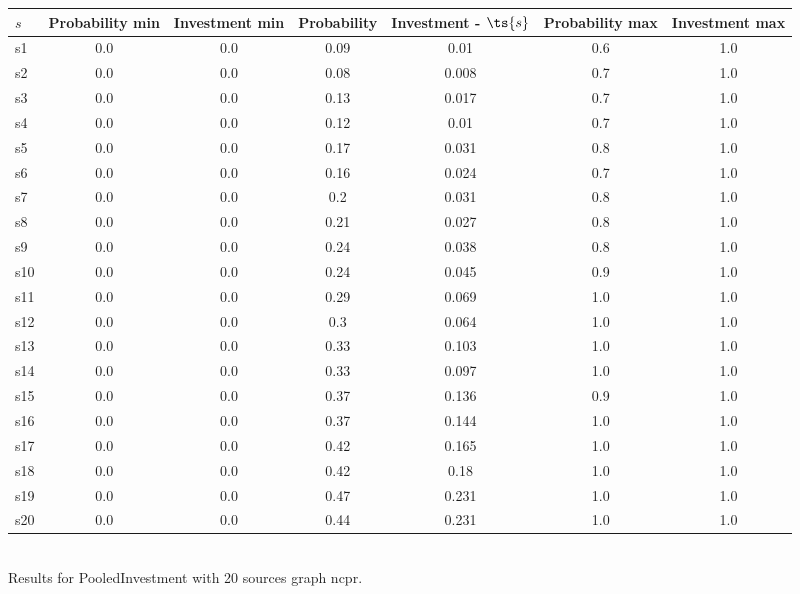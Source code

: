 \documentclass{article}
\begin{document}
\noindent\begin{tabular}{|l|c|c|c|c|c|c|}
\hline
$s$& Probability min & Investment min & Probability & Investment - $\ts{s}$ & Probability max & Investment max\\
\hline
s1 &0.0 & 0.0 & 0.09 & 0.01 & 0.6 & 1.0\\
\hline
s2 &0.0 & 0.0 & 0.08 & 0.008 & 0.7 & 1.0\\
\hline
s3 &0.0 & 0.0 & 0.13 & 0.017 & 0.7 & 1.0\\
\hline
s4 &0.0 & 0.0 & 0.12 & 0.01 & 0.7 & 1.0\\
\hline
s5 &0.0 & 0.0 & 0.17 & 0.031 & 0.8 & 1.0\\
\hline
s6 &0.0 & 0.0 & 0.16 & 0.024 & 0.7 & 1.0\\
\hline
s7 &0.0 & 0.0 & 0.2 & 0.031 & 0.8 & 1.0\\
\hline
s8 &0.0 & 0.0 & 0.21 & 0.027 & 0.8 & 1.0\\
\hline
s9 &0.0 & 0.0 & 0.24 & 0.038 & 0.8 & 1.0\\
\hline
s10 &0.0 & 0.0 & 0.24 & 0.045 & 0.9 & 1.0\\
\hline
s11 &0.0 & 0.0 & 0.29 & 0.069 & 1.0 & 1.0\\
\hline
s12 &0.0 & 0.0 & 0.3 & 0.064 & 1.0 & 1.0\\
\hline
s13 &0.0 & 0.0 & 0.33 & 0.103 & 1.0 & 1.0\\
\hline
s14 &0.0 & 0.0 & 0.33 & 0.097 & 1.0 & 1.0\\
\hline
s15 &0.0 & 0.0 & 0.37 & 0.136 & 0.9 & 1.0\\
\hline
s16 &0.0 & 0.0 & 0.37 & 0.144 & 1.0 & 1.0\\
\hline
s17 &0.0 & 0.0 & 0.42 & 0.165 & 1.0 & 1.0\\
\hline
s18 &0.0 & 0.0 & 0.42 & 0.18 & 1.0 & 1.0\\
\hline
s19 &0.0 & 0.0 & 0.47 & 0.231 & 1.0 & 1.0\\
\hline
s20 &0.0 & 0.0 & 0.44 & 0.231 & 1.0 & 1.0\\
\hline
\end{tabular}\\

\noindent Results for PooledInvestment with 20 sources graph ncpr.
\end{document}
